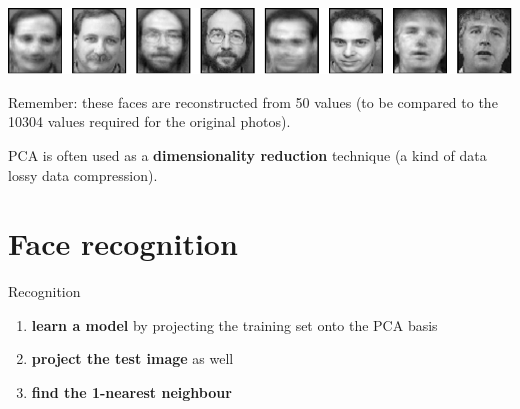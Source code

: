 \documentclass[compress]{beamer}
\begin{document}
\begin{frame}{}
    \begin{center}
        \includegraphics[width=\linewidth]{reconstruction-50-eigenfaces-top-row}

        \vspace{2em}
        Remember: these faces are reconstructed from 50 values (to be compared
        to the 10304 values required for the original photos).

        \vspace{2em}

        \pause

        PCA is often used as a \textbf{dimensionality reduction} technique (\ie a
        kind of data lossy data compression).

    \end{center}
\end{frame}


\section[Face recognition]{Face recognition}



\begin{frame}{Recognition}

    \begin{enumerate}
        \item \textbf{learn a model} by projecting the training set onto the PCA
            basis
        \item \textbf{project the test image} as well
        \item \textbf{find the 1-nearest neighbour}
    \end{enumerate}
\end{frame}
\end{document}
